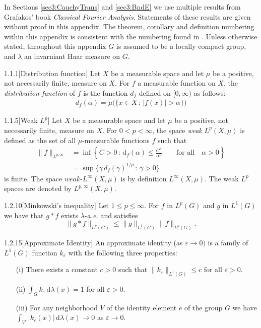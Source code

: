 \documentclass[../dissertation.tex]{subfiles}
\begin{document}
In Sections \ref{sec3:CauchyTrans} and \ref{sec3:BndE} we use multiple results
from Grafakos' book \textit{Classical Fourier Analysis}. Statements of these 
results are given without proof in this appendix. The theorem, corollary and definition 
numbering within this appendix is consistent with the numbering found in \cite{Grafakos}.
Unless otherwise stated, throughout this appendix $G$ is assumed to be a locally
compact group, and $\lambda$ an invarniant Haar measure on $G$.


\begin{mdefn}{1.1.1}[Distribution function]
	Let $X$ be a measurable space and let $\mu$ be a positive, not necessarily 
	finite, measure on $X$. For $f$ a measurable function on $X$, the
	\textit{distribution function} of $f$ is the function $d_f$ defined 
	on $[0, \infty)$ as follows:
	\begin{align*}
		d_f(\alpha) = \mu\big(\{ x\in X\,:\,|f(x)|>\alpha \}\big)
	\end{align*}
\end{mdefn}

\begin{mdefn}{1.1.5}[Weak $L^p$]
	Let $X$ be a measurable space and let $\mu$ be a positive, not necessarily 
	finite, measure on $X$. For $0<p<\infty$, the space \textit{weak} $L^p(X, \mu)$
	is defined as the set of all $\mu$-measurable functions $f$ such that
	\begin{align*}
		\|f\|_{L^{p,\infty}} 
			&=\inf
				\left\{ 
					C>0 \,:\, \mathrm{d}_f(\alpha) \leq \frac{C^p}{\alpha^p}
					\qquad \text{for all}\quad \alpha>0
				\right\} \\
			&= \sup\{ \gamma \, d_f(\gamma)^{1/p} \, : \, \gamma>0 \}
	\end{align*}
	is finite. The space $weak$-$L^\infty(X, \mu)$ is by definition $L^\infty(X, \mu)$.
	The weak $L^p$ spaces are denoted by $L^{p, \infty}(X, \mu)$.\label{sym:weakLp}
\end{mdefn}


\begin{mthm}{1.2.10}[Minkowski's inequality]
	Let $1 \leq p \leq \infty$. For $f$ in $L^p(G)$ and $g$ in $L^1(G)$
	we have that $g*f$ exists $\lambda$-\textit{a.e.} and satisfies 
	\[
		\|g*f\|_{L^p(G)} \leq \|g\|_{L^1(G)} \|f\|_{L^p(G)}.
	\]
\end{mthm}

\begin{mdefn}{1.2.15}[Approximate Identity]
	An approximate identity (as $\varepsilon\to0)$ is a family of $L^1(G)$
	function $k_\varepsilon$ with the following three properties:
	\begin{itemize}
		\item[(i)] There exists a constant $c > 0$ such that 
			$\|k_\varepsilon\|_{L^1(G)} \leq c$ for all $\varepsilon > 0$.
		\item[(ii)] $\int_G k_\varepsilon \, \mathrm{d}\lambda(x) = 1$ for all $\varepsilon > 0$.
		\item[(iii)] For any neighborhood $V$ of the identity element $e$ of the group
			$G$ we have $\int_{V^c}|k_\varepsilon (x)| \, \mathrm{d}\lambda(x) \to 0$ as 
			$\varepsilon \to 0$.
	\end{itemize}
\end{mdefn}
\end{document}
